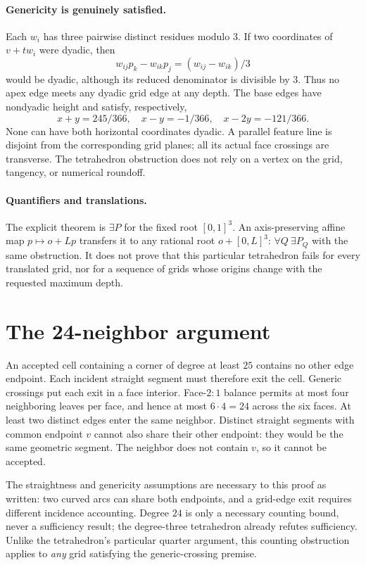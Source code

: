 \documentclass[11pt]{article}
\begin{document}
\paragraph{Genericity is genuinely satisfied.}
Each $w_i$ has three pairwise distinct residues modulo $3$. If two
coordinates of $v+t w_i$ were dyadic, then
\[
 w_{ij}p_k-w_{ik}p_j=(w_{ij}-w_{ik})/3
\]
would be dyadic, although its reduced denominator is divisible by $3$.
Thus no apex edge meets any dyadic grid edge at any depth. The base
edges have nondyadic height and satisfy, respectively,
\[
 x+y=245/366,\quad x-y=-1/366,\quad x-2y=-121/366.
\]
None can have both horizontal coordinates dyadic. A parallel feature
line is disjoint from the corresponding grid planes; all its actual
face crossings are transverse. The tetrahedron obstruction does not
rely on a vertex on the grid, tangency, or numerical roundoff.

\paragraph{Quantifiers and translations.}
The explicit theorem is $\exists P$ for the fixed root $[0,1]^3$.
An axis-preserving affine map $p\mapsto o+Lp$ transfers it to any
rational root $o+[0,L]^3$: $\forall Q\ \exists P_Q$ with the same
obstruction. It does not prove that this particular tetrahedron fails
for every translated grid, nor for a sequence of grids whose origins
change with the requested maximum depth.

\section{The 24-neighbor argument}

An accepted cell containing a corner of degree at least $25$ contains
no other edge endpoint. Each incident straight segment must therefore
exit the cell. Generic crossings put each exit in a face interior.
Face-$2{:}1$ balance permits at most four neighboring leaves per face,
and hence at most $6\cdot4=24$ across the six faces. At least two
distinct edges enter the same neighbor. Distinct straight segments with
common endpoint $v$ cannot also share their other endpoint: they
would be the same geometric segment. The neighbor does not contain
$v$, so it cannot be accepted.

The straightness and genericity assumptions are necessary to this
proof as written: two curved arcs can share both endpoints, and a
grid-edge exit requires different incidence accounting. Degree $24$
is only a necessary counting bound, never a sufficiency result; the
degree-three tetrahedron already refutes sufficiency. Unlike the
tetrahedron's particular quarter argument, this counting obstruction
applies to \emph{any} grid satisfying the generic-crossing premise.
\end{document}
